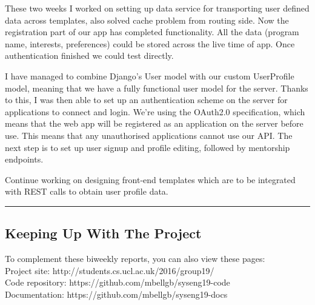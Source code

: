 \documentclass[11pt]{report}
\begin{document}
\bigskip
{}
\smallskip

\noindent
These two weeks I worked on setting up data service for transporting user
defined data across templates, also solved cache problem from routing side. Now
the registration part of our app has completed functionality. All the data
(program name, interests, preferences) could be stored across the live time of
app. Once authentication finished we could test directly.

\bigskip
{}
\smallskip

\noindent I have managed to combine Django’s User model with our custom
UserProfile model, meaning that we have a fully functional user model for the
server. Thanks to this, I was then able to set up an authentication scheme on
the server for applications to connect and login. We’re using the OAuth2.0
specification, which means that the web app will be registered as an application
on the server before use. This means that any unauthorised applications cannot
use our API\@. The next step is to set up user signup and profile editing,
followed by mentorship endpoints.

\bigskip
{}
\smallskip

\noindent Continue working on designing front-end templates which are to be
integrated with REST calls to obtain user profile data.

\hrule

\subsection*{Keeping Up With The Project}

To complement these biweekly reports, you can also view these pages:\\

\noindent
Project site: http://students.cs.ucl.ac.uk/2016/group19/\\

\noindent
Code repository: https://github.com/mbellgb/syseng19-code\\

\noindent
Documentation: https://github.com/mbellgb/syseng19-docs
\end{document}
